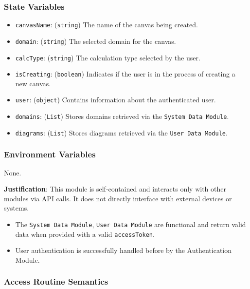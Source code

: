 \documentclass[12pt, titlepage]{article}
\begin{document}
\subsubsection{State Variables}
\begin{itemize}
  \item \texttt{canvasName}: (\texttt{string}) The name of the canvas being created.
  \item \texttt{domain}: (\texttt{string}) The selected domain for the canvas.
  \item \texttt{calcType}: (\texttt{string}) The calculation type selected by the user.
  \item \texttt{isCreating}: (\texttt{boolean}) Indicates if the user is in the process of creating a new canvas.
  \item \texttt{user}: (\texttt{object}) Contains information about the authenticated user.
  \item \texttt{domains}: (\texttt{List}) Stores domains retrieved via the \texttt{System Data Module}.
  \item \texttt{diagrams}: (\texttt{List}) Stores diagrams retrieved via the \texttt{User Data Module}.
\end{itemize}

\subsubsection{Environment Variables}
None.

\textbf{Justification}: This module is self-contained and interacts only with other modules via API calls. It does not directly interface with external devices or systems.
\begin{itemize}
  \item The \texttt{System Data Module}, \texttt{User Data Module} are functional and return valid data when provided with a valid \texttt{accessToken}.
  \item User authentication is successfully handled before by the Authentication Module.
\end{itemize}

\subsubsection{Access Routine Semantics}
\end{document}
